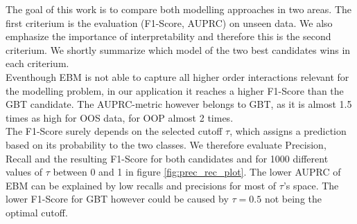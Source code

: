 \documentclass[12pt,titlepage]{article}
\begin{document}
The goal of this work is to compare both modelling approaches in two areas. The first criterium is the evaluation (F1-Score, AUPRC) on unseen data. We also emphasize the importance of interpretability and therefore this is the second criterium. We shortly summarize which model of the two best candidates wins in each criterium. \\
Eventhough EBM is not able to capture all higher order interactions relevant for the modelling problem, in our application it reaches a higher F1-Score than the GBT candidate. The AUPRC-metric however belongs to GBT, as it is almost 1.5 times as high for OOS data, for OOP almost 2 times. \\
The F1-Score surely depends on the selected cutoff $\tau$, which assigns a prediction based on its probability to the two classes. We therefore evaluate Precision, Recall and the resulting F1-Score for both candidates and for 1000 different values of $\tau$ between 0 and 1 in figure \ref{fig:prec_rec_plot}. The lower AUPRC of EBM can be explained by low recalls and precisions for most of $\tau$'s space. The lower F1-Score for GBT however could be caused by $\tau=0.5$ not being the optimal cutoff.
\end{document}
